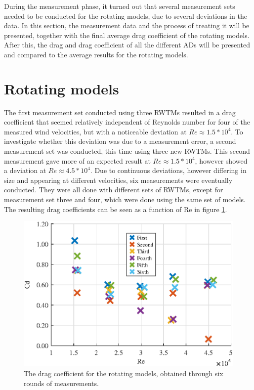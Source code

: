 
During the measurement phase, it turned out that several measurement sets needed to be conducted for the rotating models, due to several deviations in the data. In this section, the measurement data and the process of treating it will be presented, together with the final average drag coefficient of the rotating models. After this, the drag and drag coefficient of all the different \gls{AD}s will be presented and compared to the average results for the rotating models.  



\section{Rotating models}

The first measurement set conducted using three \gls{RWTM}s resulted in a drag coefficient that seemed relatively independent of Reynolds number for four of the measured wind velocities, but with a noticeable deviation at $Re \approx 1.5*10^4$. To investigate whether this deviation was due to a measurement error, a second measurement set was conducted, this time using three new \gls{RWTM}s. This second measurement gave more of an expected result at $Re \approx 1.5*10^4$, however showed a deviation at $Re \approx 4.5*10^4$. Due to continuous deviations, however differing in size and appearing at different velocities, six measurements were eventually conducted. They were all done with different sets of \gls{RWTM}s, except for measurement set three and four, which were done using the same set of models. The resulting drag coefficients can be seen as a function of Re in figure \ref{fig:RotationalCD}.

 

\begin{figure}
    \centering
    \includegraphics[width=0.8\linewidth]{0_Images/RotationalCDRe.eps}
    \caption{The drag coefficient for the rotating models, obtained through six rounds of measurements.}
    \label{fig:RotationalCD}
\end{figure}


